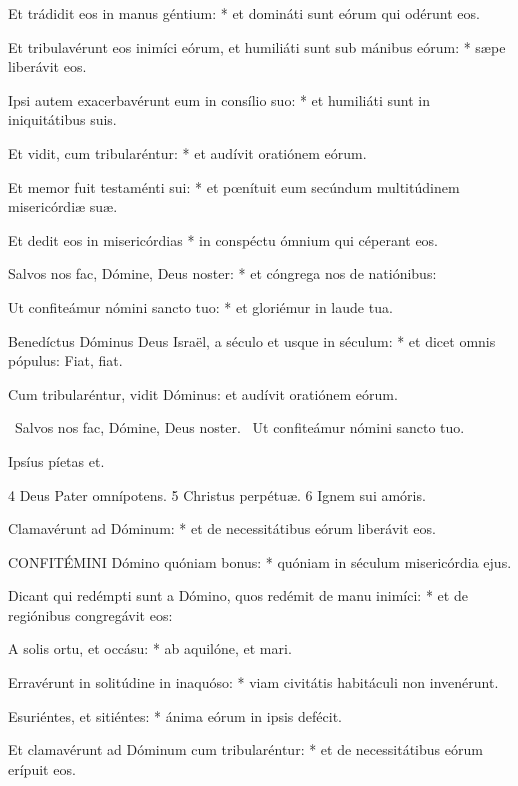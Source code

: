 Et trádidit eos in manus géntium: * et domináti sunt eórum qui odérunt eos.

Et tribulavérunt eos inimíci eórum, et humiliáti sunt sub mánibus eórum: * sæpe liberávit eos.

Ipsi autem exacerbavérunt eum in consílio suo: * et humiliáti sunt in iniquitátibus suis.

Et vidit, cum tribularéntur: * et audívit oratiónem eórum.

Et memor fuit testaménti sui: * et pœnítuit eum secúndum multitúdinem misericórdiæ suæ.

Et dedit eos in misericórdias * in conspéctu ómnium qui céperant eos.

Salvos nos fac, Dómine, Deus noster: * et cóngrega nos de natiónibus:

Ut confiteámur nómini sancto tuo: * et gloriémur in laude tua.

Benedíctus Dóminus Deus Israël, a século et usque in séculum: * et dicet omnis pópulus: Fiat, fiat.

 Cum tribularéntur, vidit Dóminus: et audívit oratiónem eórum.


\V\ Salvos nos fac, Dómine, Deus noster. \R\ Ut confiteámur nómini sancto tuo.

 Ipsíus píetas et.

 4 Deus Pater omnípotens. 5 Christus perpétuæ. 6 Ignem sui amóris.


 Clamavérunt ad Dóminum: * et de necessitátibus eórum liberávit eos.


\lettrine[lines=2]{C}{ONFITÉMINI} Dómino quóniam bonus: * quóniam in séculum misericórdia ejus.

Dicant qui redémpti sunt a Dómino, quos redémit de manu inimíci: * et de regiónibus congregávit eos:

A solis ortu, et occásu: * ab aquilóne, et mari.

Erravérunt in solitúdine in inaquóso: * viam civitátis habitáculi non invenérunt.

Esuriéntes, et sitiéntes: * ánima eórum in ipsis defécit.

Et clamavérunt ad Dóminum cum tribularéntur: * et de necessitátibus eórum erípuit eos.


